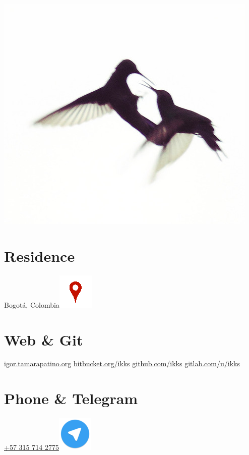 \begin{aside}
  \includegraphics[scale=0.28]{img/coruscan.jpg}
    ~
  \section{Residence}
    Bogotá, Colombia\includegraphics[scale=0.15]{img/ubicacion.png}
    ~
    ~
    ~
  \section{Web \& Git}
    \href{https://igor.tamarapatino.org}{igor.tamarapatino.org}
    \href{https://bitbucket.org/ikks}{bitbucket.org/ikks}
    \href{https://github.com/ikks}{github.com/ikks}
    \href{https://gitlab.com/ikks}{gitlab.com/u/ikks}
  \section{Phone \& Telegram}
    \href{callto:+573157142775}{+57 315 714 2775\includegraphics[scale=0.15]{img/telegram.png}}
    ~
    ~
    ~
    ~

\end{aside}
